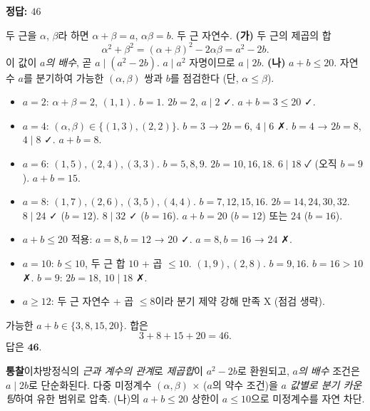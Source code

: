\documentclass[10pt]{article}
\newcommand{\solnote}[1]{\par\smallskip\noindent
  \begin{tcolorbox}[enhanced, breakable, colback=vB-light, colframe=vB-light,
    boxrule=0pt, arc=3pt, left=10pt, right=10pt, top=4pt, bottom=4pt,
    fontupper=\sffamily\footnotesize\color{vB-ink}]
    \textbf{\color{vB-deep}통찰}\quad #1
  \end{tcolorbox}}
\begin{document}
\begin{answerbox}\sffamily\bfseries 정답: $46$\end{answerbox}
 두 근을 $\alpha$, $\beta$라 하면 $\alpha + \beta = a$, $\alpha\beta = b$. 두 근 자연수.
 \textbf{(가)} 두 근의 제곱의 합
\[ \alpha^2 + \beta^2 = (\alpha + \beta)^2 - 2\alpha\beta = a^2 - 2b. \]
이 값이 \emph{$a$의 배수}, 곧 $a \mid (a^2 - 2b)$. $a \mid a^2$ 자명이므로 $a \mid 2b$.
 \textbf{(나)} $a + b \le 20$.
 자연수 $a$를 분기하여 가능한 $(\alpha, \beta)$ 쌍과 $b$를 점검한다 (단, $\alpha \le \beta$).
\begin{itemize}\setlength{\itemsep}{0pt}
\item $a = 2$: $\alpha + \beta = 2$, $(1, 1)$. $b = 1$. $2b = 2$, $a \mid 2$ ✓. $a + b = 3 \le 20$ ✓.
\item $a = 4$: $(\alpha, \beta) \in \{(1, 3), (2, 2)\}$. $b = 3$ → $2b = 6$, $4 \mid 6$ ✗. $b = 4$ → $2b = 8$, $4 \mid 8$ ✓. $a + b = 8$.
\item $a = 6$: $(1, 5), (2, 4), (3, 3)$. $b = 5, 8, 9$. $2b = 10, 16, 18$. $6 \mid 18$ ✓ (오직 $b = 9$). $a + b = 15$.
\item $a = 8$: $(1, 7), (2, 6), (3, 5), (4, 4)$. $b = 7, 12, 15, 16$. $2b = 14, 24, 30, 32$. $8 \mid 24$ ✓ ($b = 12$). $8 \mid 32$ ✓ ($b = 16$). $a + b = 20$ ($b = 12$) 또는 $24$ ($b = 16$).
\item $a + b \le 20$ 적용: $a = 8, b = 12$ → $20$ ✓. $a = 8, b = 16$ → $24$ ✗.
\item $a = 10$: $b \le 10$, 두 근 합 $10$ + 곱 $\le 10$. $(1, 9), (2, 8)$. $b = 9, 16$. $b = 16 > 10$ ✗. $b = 9$: $2b = 18$, $10 \mid 18$ ✗.
\item $a \ge 12$: 두 근 자연수 + 곱 $\le 8$이라 분기 제약 강해 만족 X (점검 생략).
\end{itemize}
 가능한 $a + b \in \{3, 8, 15, 20\}$. 합은
\[ 3 + 8 + 15 + 20 = 46. \]
답은 $\textbf{46}$.
\solnote{이차방정식의 \emph{근과 계수의 관계}로 \emph{제곱합}이 $a^2 - 2b$로 환원되고, \emph{$a$의 배수} 조건은 $a \mid 2b$로 단순화된다. 다중 미정계수 $(\alpha, \beta)$ × ($a$의 약수 조건)을 \emph{$a$ 값별로 분기 카운팅}하여 유한 범위로 압축. (나)의 \emph{$a + b \le 20$} 상한이 $a \le 10$으로 미정계수를 자연 차단.}
\end{document}
